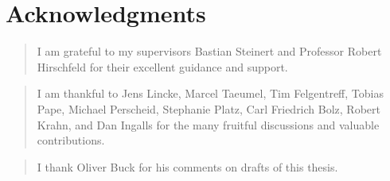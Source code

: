 \begingroup
\let\raggedsection\centering

\chapter*{Acknowledgments} \label{cha:acknowledgments}
\endgroup

\begin{quotation}
  \noindent I am grateful to my supervisors Bastian Steinert and Professor Robert Hirschfeld for their excellent guidance and support. 
\end{quotation}

\begin{quotation}
  \noindent I am thankful to Jens Lincke, Marcel Taeumel, Tim Felgentreff, Tobias Pape, Michael Perscheid, Stephanie Platz, Carl Friedrich Bolz, Robert Krahn, and Dan Ingalls for the many fruitful discussions and valuable contributions.
\end{quotation}

\begin{quotation}
  \noindent I thank Oliver Buck for his comments on drafts of this thesis.
\end{quotation}

